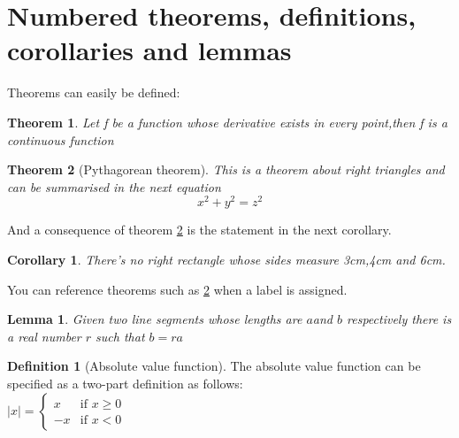 \documentclass{article}
\newtheorem{theorem}{Theorem}[section]
\newtheorem{corollary}{Corollary}[theorem]
\newtheorem{lemma}{Lemma}[theorem]
\theoremstyle{definition}
\newtheorem{definition}{Definition}[section]
\begin{document}
\section{Numbered theorems, definitions, corollaries and lemmas}
Theorems can easily be defined:
\begin{theorem}
Let f be a function whose derivative exists in every point,then f is a
continuous function
\end{theorem}
\begin{theorem}[Pythagorean theorem]
\label{pythagorean}
This is a theorem about right triangles and can be summarised in the next equation
\[x^2+y^2=z^2\]
\end{theorem}
And a consequence of theorem \ref{pythagorean} is the statement in the next
corollary.
\begin{corollary}
There's no right rectangle whose sides measure 3cm,4cm and 6cm.
\end{corollary}
You can reference theorems such as \ref{pythagorean} when a label is assigned.
\begin{lemma}
Given two line segments whose lengths are \(a\)and \(b\) respectively there is a real
number \(r\) such that \(b=ra\)
\end{lemma}
\begin{definition}[Absolute value function]
The absolute value function can be specified as a two-part definition as follows:\\
$
|x|=
\left\{
\begin{array}{ll}
x &  \mbox{if }   x \geq 0\\
-x &  \mbox{if }   x < 0
\end{array}
\right.
$
\end{definition}
\end{document}
